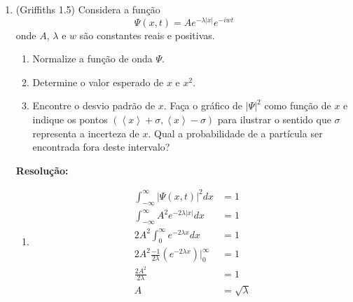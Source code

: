 \documentclass[a4paper, 12pt, notitlepage]{article}
\begin{document}
\begin{enumerate}
\item (Griffiths 1.5) Considera a função
\begin{equation*}
\Psi(x,t) = A e^{-\lambda |x|} e^{-iw t}
\end{equation*}
\noindent onde $A$, $\lambda$ e $w$ são constantes reais e positivas.
\begin{enumerate}
  \item Normalize a função de onda $\Psi$.
  \item Determine o valor esperado de $x$ e $x^2$.
  \item Encontre o desvio padrão de $x$. Faça o gráfico de $\left|\Psi\right|^2$ como função de $x$ e indique os pontos $\left(\left\langle x \right\rangle + \sigma, \left\langle x \right\rangle - \sigma\right)$ para ilustrar o sentido que $\sigma$ representa a incerteza de $x$. Qual a probabilidade de a partícula ser encontrada fora deste intervalo?
\end{enumerate}

\textbf{Resolução: }\linebreak
\begin{enumerate}
  \item 
  \begin{align*}
  \int_{-\infty}^{\infty} |\Psi(x,t)|^2 dx &= 1\\
  \int_{-\infty}^{\infty} A^2 e^{-2\lambda |x|} dx &= 1 \\
  2A^2\int_0^\infty e^{-2\lambda x} dx &= 1 \\
  2A^2\frac{-1}{2\lambda}\left(e^{-2\lambda x}\right) \Bigg|_0^{\infty} &= 1 \\
  \frac{2A^2}{2\lambda} &= 1 \\
  A &= \sqrt{\lambda}
  \end{align*}
  

\end{enumerate}
\end{enumerate}
\end{document}
